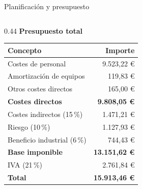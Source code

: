 \documentclass[aspectratio=169]{beamer}
\begin{document}
\begin{frame}[t]{Planificación y presupuesto}
\begin{columns}[T,onlytextwidth]
\begin{column}{0.44\textwidth}
  \centering
  {\scriptsize\textbf{\color{uc3mblue}Presupuesto total}}\\[0.4em]
  {\scriptsize
  \begin{tabular}{@{}lr@{}}
  \toprule
  \textbf{Concepto} & \textbf{Importe} \\
  \midrule
  Costes de personal            & 9.523,22 € \\
  Amortización de equipos       & 119,83 € \\
  Otros costes directos         & 165,00 € \\
  \midrule
  \textbf{Costes directos}      & \textbf{9.808,05 €} \\
  Costes indirectos (15\,\%)    & 1.471,21 € \\
  Riesgo (10\,\%)               & 1.127,93 € \\
  Beneficio industrial (6\,\%)  & 744,43 € \\
  \midrule
  \textbf{Base imponible}       & \textbf{13.151,62 €} \\
  IVA (21\,\%)                  & 2.761,84 € \\
  \midrule
  \textbf{Total}                & \textbf{15.913,46 €} \\
  \bottomrule
  \end{tabular}}
\end{column}
\end{columns}

\vspace{0.7em}
\centering
{}
\end{frame}
\end{document}
